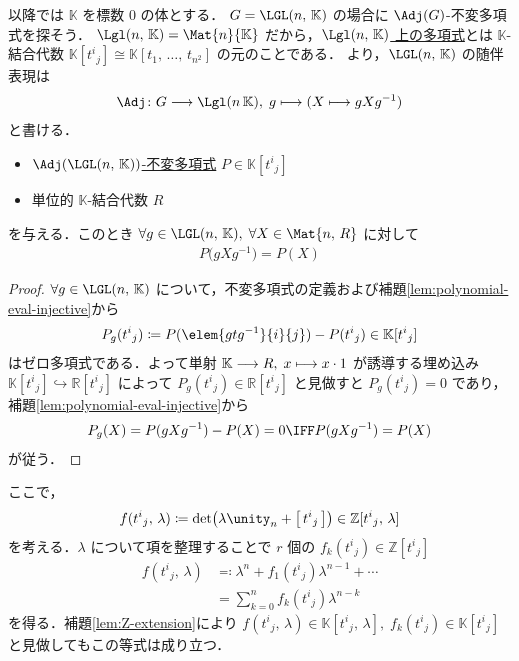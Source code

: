 \documentclass[TQFT_main]{subfiles}
\begin{document}
以降では $\mathbb{K}$ を標数 $0$ の体とする．
$G = \LGL(n,\, \mathbb{K})$ の場合に $\Adj(G)$-不変多項式を探そう．
$\Lgl(n,\, \mathbb{K}) = \Mat{n}{\mathbb{K}}$ だから，\hyperref[def:polynomial]{$\Lgl (n,\, \mathbb{K})$ 上の多項式}とは $\mathbb{K}$-結合代数 $\mathbb{K}[t^i{}_j] \cong \mathbb{K}[t_1,\, \dots,\, t_{n^2}]$ の元のことである．
より，$\LGL(n,\, \mathbb{K})$ の随伴表現は
\begin{align}
    \Adj \colon G \lto \Lgl(n\, \mathbb{K}),\; g \lmto (X \lmto gXg^{-1})
\end{align}
と書ける．

\begin{mylem}[label=lem:invariant-gl]{}
    \begin{itemize}
        \item \hyperref[def:invariant]{$\Adj(\LGL (n,\, \mathbb{K}))$-不変多項式}  $P \in \mathbb{K}[t^i{}_j]$
        \item 単位的 $\mathbb{K}$-結合代数 $R$
    \end{itemize}
    を与える．このとき $\forall g \in \LGL (n,\, \mathbb{K}),\; \forall X \in \Mat{n,\, R}$ に対して
    \begin{align}
        P \bigl( g Xg^{-1} \bigr) = P(X)
    \end{align}
\end{mylem}

\begin{proof}
    $\forall g \in \LGL (n,\, \mathbb{K})$ について，不変多項式の定義および補題\ref{lem:polynomial-eval-injective}から
    \begin{align}
        P_g (t^i{}_j) \coloneqq P(\elem{gtg^{-1}}{i}{j}) - P(t^i{}_j) \in \mathbb{K}[t^i{}_j]
    \end{align}
    はゼロ多項式である．よって単射 $\mathbb{K} \longrightarrow R,\; x \longmapsto x \cdot 1$ が誘導する埋め込み $\mathbb{K}[t^i{}_j] \hookrightarrow \mathbb{R}[t^i{}_j]$ によって $P_g (t^i{}_j) \in \mathbb{R}[t^i{}_j]$ と見做すと $P_g (t^i{}_j) = 0$ であり，補題\ref{lem:polynomial-eval-injective}から
    \begin{align}
        P_g (X) = P(gXg^{-1}) - P(X) = 0 \IFF P(gXg^{-1}) = P(X)
    \end{align}
    が従う．
\end{proof}

ここで，
\begin{align}
    f(t^i{}_j,\, \lambda) \coloneqq \det(\lambda \unity_n + \bigl[ \,t^i{}_j\, \bigr] ) \in \mathbb{Z}[t^i{}_j,\, \lambda]
\end{align}
を考える．$\lambda$ について項を整理することで $r$ 個の $f_k (t^i{}_j) \in \mathbb{Z}[t^i{}_j]$
\begin{align}
    f(t^i{}_j,\, \lambda) 
    &\eqqcolon \lambda^n + f_1(t^i{}_j) \lambda^{n-1} + \cdots \\
    &= \sum_{k=0}^n f_k(t^i{}_j) \lambda^{n-k}
\end{align}
を得る．補題\ref{lem:Z-extension}により $f(t^i{}_j,\, \lambda) \in \mathbb{K}[t^i{}_j,\, \lambda],\;  f_k (t^i{}_j) \in \mathbb{K}[t^i{}_j]$ と見做してもこの等式は成り立つ．
\end{document}
